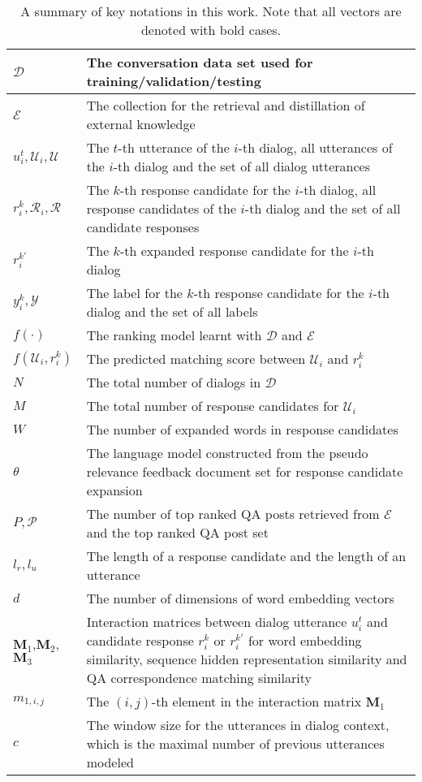   \begin{table}[!t]
  	\footnotesize
	\caption{A summary of key notations in this work. Note that all vectors are denoted with bold cases.}
	\vspace{-10pt}
	\begin{tabular}
		{ p{} | p{}} \hline  \hline
		$\mathcal{D}$ & The conversation data set used for training/validation/testing\\\hline
		$\mathcal{E}$ & The collection for the retrieval and distillation of external knowledge \\ \hline
		$u_i^t, \mathcal{U}_i, \mathcal{U}$ & The $t$-th utterance of the $i$-th dialog, all utterances of the $i$-th dialog and the set of all dialog utterances\\\hline
		$r_i^k, \mathcal{R}_i, \mathcal{R}$ & The $k$-th response candidate for the  $i$-th dialog, all response candidates of the  $i$-th dialog and the set of all candidate responses\\\hline
		$r_i^{k'}$ & The $k$-th expanded response candidate for the  $i$-th dialog \\ \hline
		$y_i^k, \mathcal{Y}$ & The label for the $k$-th response candidate for the $i$-th dialog and the set of all labels \\ \hline
		$f(\cdot)$ & The ranking model learnt with $\mathcal{D}$ and $\mathcal{E}$ \\ \hline
		$f( \mathcal{U}_i, r_i^k ) $ & The predicted matching score between $\mathcal{U}_i$ and $r_i^k$ \\ \hline
		$N$ & The total number of dialogs in $\mathcal{D}$\\ \hline
		$M$ & The total number of response candidates for $\mathcal{U}_i$\\ \hline
		$W$ & The number of expanded words in response candidates\\ \hline
		$\theta$ & The language model constructed from the pseudo relevance feedback document set for response candidate expansion\\ \hline
		$P, \mathcal{P} $ & The number of top ranked QA posts  retrieved from $\mathcal{E}$ and  the top ranked QA post set \\ \hline
		$l_r, l_u$ & The length of a response candidate and the length of an utterance \\ \hline
		$d$ & The number of dimensions of word embedding vectors \\ \hline
		$\mathbf{M}_1$,$\mathbf{M}_2$,$\mathbf{M}_3$ & Interaction matrices between dialog utterance $u_i^t$ and candidate response $r_i^k$ or  $r_i^{k'}$ for word embedding similarity, sequence hidden representation similarity and QA  correspondence matching similarity\\ \hline
		$m_{1,i,j}$ & The $(i,j)$-th element in the interaction matrix $\mathbf{M}_1$\\ \hline
		$c$ & The window size for the utterances in dialog context, which is the maximal number of previous utterances modeled \\ \hline  \hline
	\end{tabular}\label{tab:notation}
	\vspace{-10pt}
\end{table}

